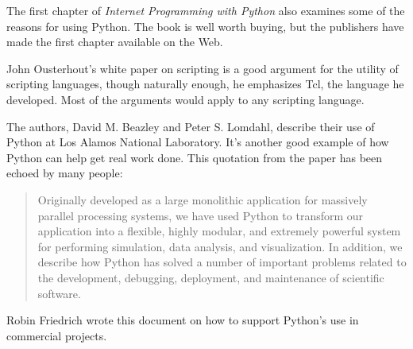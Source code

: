 \documentclass{howto}
\begin{document}
\begin{definitions}


The first chapter of \emph{Internet Programming with Python} also
examines some of the reasons for using Python.  The book is well worth
buying, but the publishers have made the first chapter available on
the Web.

 
John Ousterhout's white paper on scripting is a good argument for the
utility of scripting languages, though naturally enough, he emphasizes
Tcl, the language he developed.  Most of the arguments would apply to
any scripting language.


The authors, David M. Beazley and Peter S. Lomdahl, 
describe their use of Python at Los Alamos National Laboratory.
It's another good example of how Python can help get real work done.
This quotation from the paper has been echoed by many people:

\begin{quotation}
       Originally developed as a large monolithic application for
       massively parallel processing systems, we have used Python to
       transform our application into a flexible, highly modular, and
       extremely powerful system for performing simulation, data
       analysis, and visualization. In addition, we describe how Python
       has solved a number of important problems related to the
       development, debugging, deployment, and maintenance of scientific
       software.
\end{quotation}

 


Robin Friedrich wrote this document on how to support Python's use in
commercial projects.



\end{definitions}
\end{document}
